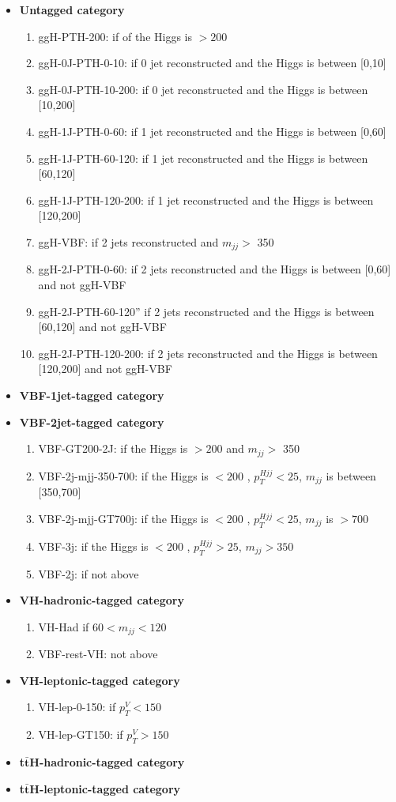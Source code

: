 \begin{itemize}
\item {\bf Untagged category}
\begin{enumerate}
\item{ggH-PTH-200}: if \pt of the Higgs is $> 200$ \GeV 
\item{ggH-0J-PTH-0-10}: if 0 jet reconstructed and the Higgs \pt is between [0,10] \GeV  
\item{ggH-0J-PTH-10-200}: if 0 jet reconstructed and the Higgs \pt is between [10,200] \GeV  
\item{ggH-1J-PTH-0-60}: if 1 jet reconstructed and the Higgs \pt is between [0,60] \GeV  
\item{ggH-1J-PTH-60-120}: if 1 jet reconstructed and the Higgs \pt is between [60,120] \GeV  
\item{ggH-1J-PTH-120-200}: if 1 jet reconstructed and the Higgs \pt is between [120,200] \GeV  
\item{ggH-VBF}: if 2 jets reconstructed and $m_{jj} >$ 350\GeV 
\item{ggH-2J-PTH-0-60}: if 2 jets reconstructed and the Higgs \pt is between [0,60] \GeV and not ggH-VBF 
\item{ggH-2J-PTH-60-120}'' if 2 jets reconstructed and the Higgs \pt is between [60,120] \GeV and not ggH-VBF
\item{ggH-2J-PTH-120-200}: if 2 jets reconstructed and the Higgs \pt is between [120,200] \GeV and not ggH-VBF
\end{enumerate}
\item {\bf VBF-1jet-tagged category}
\item {\bf VBF-2jet-tagged category}
\begin{enumerate}
\item{VBF-GT200-2J}: if the Higgs \pt is $> 200$ \GeV and $m_{jj} >$ 350\GeV
\item{VBF-2j-mjj-350-700}: if the Higgs \pt is $< 200$ \GeV, $p_T^{Hjj}<25$\GeV, $m_{jj}$ is between [350,700]\GeV 
\item{VBF-2j-mjj-GT700j}: if the Higgs \pt is $< 200$ \GeV, $p_T^{Hjj}<25$\GeV, $m_{jj}$ is $>700$\GeV 
\item{VBF-3j}: if the Higgs \pt is $< 200$ \GeV, $p_T^{Hjj}>25$\GeV, $m_{jj}>350$\GeV 
\item{VBF-2j}: if not above 
\end{enumerate}
\item {\bf VH-hadronic-tagged category}
\begin{enumerate}
\item{VH-Had} if $60<m_{jj}<120$\GeV 
\item{VBF-rest-VH}: not above 
\end{enumerate}
\item {\bf VH-leptonic-tagged category} 
\begin{enumerate}
\item{VH-lep-0-150}: if $p_T^{V} < 150$\GeV 
\item{VH-lep-GT150}: if $p_T^{V} > 150$\GeV 
\end{enumerate}
\item {\bf t$\mathbf{\bar{t}}$H-hadronic-tagged category} 
\item {\bf t$\mathbf{\bar{t}}$H-leptonic-tagged category}
\end{itemize}

